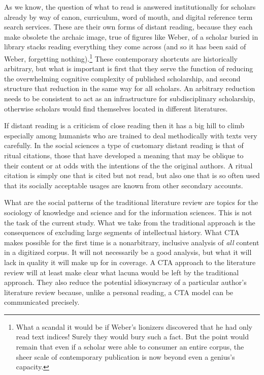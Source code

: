 \documentclass[]{book}
\let\rmarkdownfootnote\footnote%
\def\footnote{\protect\rmarkdownfootnote}
\theoremstyle{definition}
\theoremstyle{definition}
\theoremstyle{definition}
\theoremstyle{remark}
\begin{document}
As we know, the question of what to read is answered institutionally for
scholars already by way of canon, curriculum, word of mouth, and digital
reference term search services. These are their own forms of distant
reading, because they each make obsolete the archaic image, true of
figures like Weber, of a scholar buried in library stacks reading
everything they come across (and so it has been said of Weber,
forgetting nothing).\footnote{What a scandal it would be if Weber's
  lionizers discovered that he had only read text indices! Surely they
  would bury such a fact. But the point would remain that even if a
  scholar were able to consumer an entire corpus, the sheer scale of
  contemporary publication is now beyond even a genius's capacity.}
These contemporary shortcuts are historically arbitrary, but what is
important is first that they serve the function of reducing the
overwhelming cognitive complexity of published scholarship, and second
structure that reduction in the same way for all scholars. An arbitrary
reduction needs to be consistent to act as an infrastructure for
subdisciplinary scholarship, otherwise scholars would find themselves
located in different literatures.

If distant reading is a criticism of close reading then it has a big
hill to climb especially among humanists who are trained to deal
methodically with texts very carefully. In the social sciences a type of
customary distant reading is that of ritual citations, those that have
developed a meaning that may be oblique to their content or at odds with
the intentions of the the original authors. A ritual citation is simply
one that is cited but not read, but also one that is so often used that
its socially acceptable usages are known from other secondary accounts.

What are the social patterns of the traditional literature review are
topics for the sociology of knowledge and science and for the
information sciences. This is not the task of the current study. What we
take from the traditional approach is the consequences of excluding
large segments of intellectual history. What CTA makes possible for the
first time is a nonarbitrary, inclusive analysis of \emph{all} content
in a digitized corpus. It will not necessarily be a good analysis, but
what it will lack in quality it will make up for in coverage. A CTA
approach to the literature review will at least make clear what lacuna
would be left by the traditional approach. They also reduce the
potential idiosyncrasy of a particular author's literature review
because, unlike a personal reading, a CTA model can be communicated
precisely.
\end{document}
